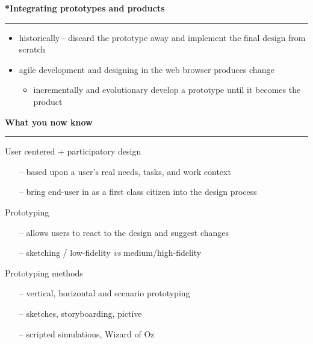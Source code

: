 \documentclass[pdf]{beamer}
\begin{document}
\begin{frame}
\vspace{8mm}
\textcolor{myBlue}{\textbf{\Large{*Integrating prototypes and products}}}

\textcolor{red}{\rule{10cm}{1mm}}

\begin{itemize}
\item
historically - discard the prototype away and implement the final design from scratch
\newline

\item agile development and designing in the web browser produces change
\begin{itemize}
\item incrementally and evolutionary develop a prototype until it becomes the product
\end{itemize}
\end{itemize}

\end{frame}



\begin{frame}
\vspace{8mm}
\textcolor{myBlue}{\textbf{\Large{What you now know}}}

\textcolor{red}{\rule{10cm}{1mm}}

User centered + participatory design

\begin{itemize}
      \item[\textcolor{black}{--}] based upon a user’s real needs, tasks, and work context
      
      \item[\textcolor{black}{--}] bring end-user in as a first class citizen into the design process

  \end{itemize}
    \bigskip
 Prototyping
 
 \begin{itemize}
      \item[\textcolor{black}{--}] allows users to react to the design and suggest changes 
      
      \item[\textcolor{black}{--}] sketching / low-fidelity \textit{vs} medium/high-fidelity 


  \end{itemize}
  
  \bigskip
Prototyping methods 

\begin{itemize}
      \item[\textcolor{black}{--}] vertical, horizontal and scenario prototyping

      \item[\textcolor{black}{--}]sketches, storyboarding, pictive	
      \item[\textcolor{black}{--}] scripted simulations, Wizard of Oz
     
  \end{itemize}    
\end{frame}
\end{document}
